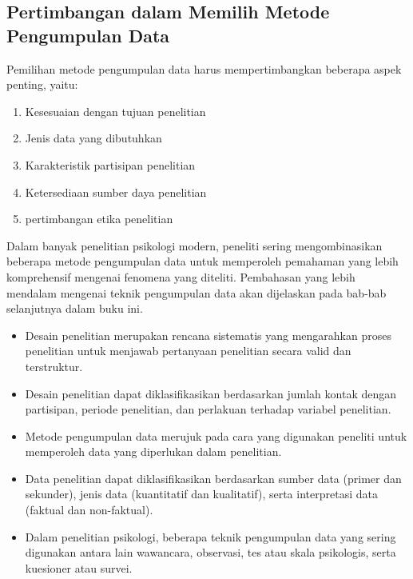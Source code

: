 \documentclass[
  indonesian,
  letterpaper,
  DIV=11,
  numbers=noendperiod]{scrreprt}
\providecommand{\tightlist}{%
  \setlength{\itemsep}{0pt}\setlength{\parskip}{0pt}}
\begin{document}
\subsection{Pertimbangan dalam Memilih Metode Pengumpulan
Data}\label{pertimbangan-dalam-memilih-metode-pengumpulan-data}

Pemilihan metode pengumpulan data harus mempertimbangkan beberapa aspek
penting, yaitu:

\begin{enumerate}
\def\labelenumi{\alph{enumi}.}
\tightlist
\item
  Kesesuaian dengan tujuan penelitian
\item
  Jenis data yang dibutuhkan
\item
  Karakteristik partisipan penelitian
\item
  Ketersediaan sumber daya penelitian
\item
  pertimbangan etika penelitian
\end{enumerate}

Dalam banyak penelitian psikologi modern, peneliti sering
mengombinasikan beberapa metode pengumpulan data untuk memperoleh
pemahaman yang lebih komprehensif mengenai fenomena yang diteliti.
Pembahasan yang lebih mendalam mengenai teknik pengumpulan data akan
dijelaskan pada bab-bab selanjutnya dalam buku ini.

\begin{tcolorbox}[enhanced jigsaw, colframe=quarto-callout-tip-color-frame, toptitle=1mm, breakable, leftrule=.75mm, arc=.35mm, toprule=.15mm, colback=white, colbacktitle=quarto-callout-tip-color!10!white, bottomtitle=1mm, bottomrule=.15mm, titlerule=0mm, title=\textcolor{quarto-callout-tip-color}{\faLightbulb}\hspace{0.5em}{Rangkuman}, coltitle=black, left=2mm, opacitybacktitle=0.6, opacityback=0, rightrule=.15mm]

\begin{itemize}
\tightlist
\item
  Desain penelitian merupakan rencana sistematis yang mengarahkan proses
  penelitian untuk menjawab pertanyaan penelitian secara valid dan
  terstruktur.
\item
  Desain penelitian dapat diklasifikasikan berdasarkan jumlah kontak
  dengan partisipan, periode penelitian, dan perlakuan terhadap variabel
  penelitian.
\item
  Metode pengumpulan data merujuk pada cara yang digunakan peneliti
  untuk memperoleh data yang diperlukan dalam penelitian.
\item
  Data penelitian dapat diklasifikasikan berdasarkan sumber data (primer
  dan sekunder), jenis data (kuantitatif dan kualitatif), serta
  interpretasi data (faktual dan non-faktual).
\item
  Dalam penelitian psikologi, beberapa teknik pengumpulan data yang
  sering digunakan antara lain wawancara, observasi, tes atau skala
  psikologis, serta kuesioner atau survei.
\end{itemize}

\end{tcolorbox}
\end{document}
